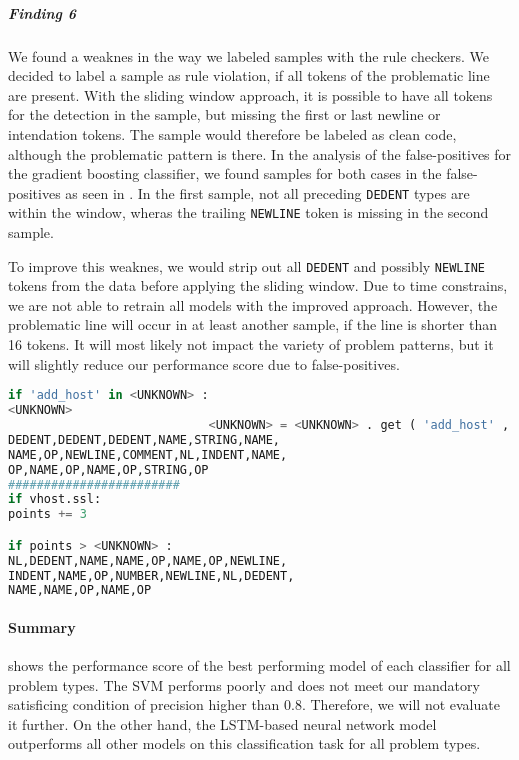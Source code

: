 \subparagraph{Finding 6}
We found a weaknes in the way we labeled samples with the rule checkers. We decided to label a sample as rule violation, if all tokens of the problematic line are present. With the sliding window approach, it is possible to have all tokens for the detection in the sample, but missing the first or last newline or intendation tokens. The sample would therefore be labeled as clean code, although the problematic pattern is there. In the analysis of the false-positives for the gradient boosting classifier, we found samples for both cases in the false-positives as seen in . In the first sample, not all preceding \texttt{DEDENT} types are within the window, wheras the trailing \texttt{NEWLINE} token is missing in the second sample.

To improve this weaknes, we would strip out all \texttt{DEDENT} and possibly \texttt{NEWLINE} tokens from the data before applying the sliding window. Due to time constrains, we are not able to retrain all models with the improved approach. However, the problematic line will occur in at least another sample, if the line is shorter than 16 tokens. It will most likely not impact the variety of problem patterns, but it will slightly reduce our performance score due to false-positives.


\begin{lstlisting}[float,floatplacement=H, language=Python, label=lst:weaknes_end_start_sliding_window, caption={False-positives of the best gradient boosting classifier with 300 boosting stages, a learning rate of 0.2, type encoding and without resampling for the CCS type. In the first sample, not all preceding \texttt{DEDENT} tokens are in this window. For the second example, the trailing \texttt{NEWLINE} token is missing in the window. Without this encoding issue, both samples would have been detected correctly.}]
if 'add_host' in <UNKNOWN> : 
<UNKNOWN> 
                            <UNKNOWN> = <UNKNOWN> . get ( 'add_host' ,
DEDENT,DEDENT,DEDENT,NAME,STRING,NAME,
NAME,OP,NEWLINE,COMMENT,NL,INDENT,NAME,
OP,NAME,OP,NAME,OP,STRING,OP
########################
if vhost.ssl: 
points += 3 

if points > <UNKNOWN> :
NL,DEDENT,NAME,NAME,OP,NAME,OP,NEWLINE,
INDENT,NAME,OP,NUMBER,NEWLINE,NL,DEDENT,
NAME,NAME,OP,NAME,OP
\end{lstlisting}


\paragraph{Summary}

  shows the performance score of the best performing model of each classifier for all problem types.
 The SVM performs poorly and does not meet our mandatory satisficing condition of precision higher than 0.8. Therefore, we will not evaluate it further. On the other hand, the LSTM-based neural network model outperforms all other models on this classification task for all problem types.

